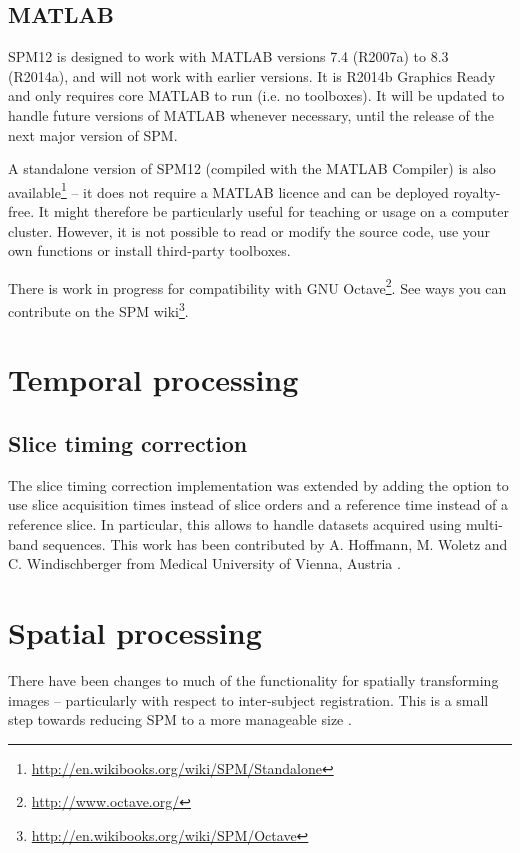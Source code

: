 \documentclass[a4paper,titlepage,openany]{article}
\begin{document}
\subsection{MATLAB}
SPM12 is designed to work with MATLAB versions 7.4 (R2007a) to 8.3 (R2014a), and will not work with earlier versions. It is R2014b Graphics Ready and only requires core MATLAB to run (i.e. no toolboxes). It will be updated to handle future versions of MATLAB whenever necessary, until the release of the next major version of SPM.

A standalone version of SPM12 (compiled with the MATLAB Compiler) is also available\footnote{\url{http://en.wikibooks.org/wiki/SPM/Standalone}} -- it does not require a MATLAB licence and can be deployed royalty-free. It might therefore be particularly useful for teaching or usage on a computer cluster. However, it is not possible to read or modify the source code, use your own functions or install third-party toolboxes.

There is work in progress for compatibility with GNU Octave\footnote{\url{http://www.octave.org/}}. See ways you can contribute on the SPM wiki\footnote{\url{http://en.wikibooks.org/wiki/SPM/Octave}}.

\section{Temporal processing}

\subsection{Slice timing correction}
The slice timing correction implementation was extended by adding the option to use slice acquisition times instead of slice orders and a reference time instead of a reference slice. In particular, this allows to handle datasets acquired using multi-band sequences. This work has been contributed by A. Hoffmann, M. Woletz and C. Windischberger from Medical University of Vienna, Austria \cite{woletz2014st}.

\section{Spatial processing}
There have been changes to much of the functionality for spatially transforming images -- particularly with respect to inter-subject registration.
This is a small step towards reducing SPM to a more manageable size \cite{ashburner2011spm}.
\end{document}
